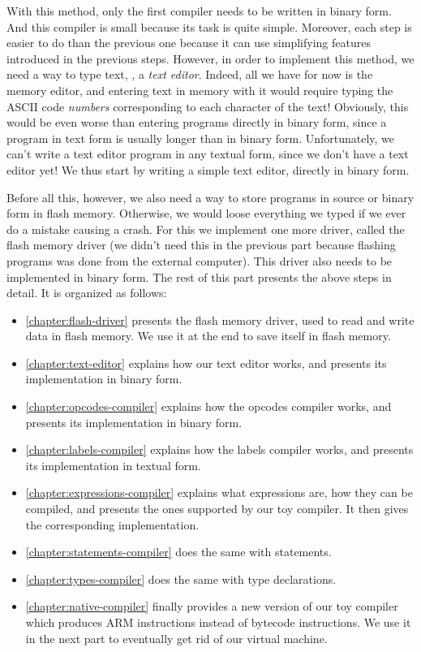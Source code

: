 With this method, only the first compiler needs to be written in binary form.
And this compiler is small because its task is quite simple. Moreover, each
step is easier to do than the previous one because it can use simplifying
features introduced in the previous steps. However, in order to implement this
method, we need a way to type text, \ie, a {\em text editor}. Indeed, all we
have for now is the memory editor, and entering text in memory with it would
require typing the ASCII code {\em numbers} corresponding to each character of
the text! Obviously, this would be even worse than entering programs directly
in binary form, since a program in text form is usually longer than in binary
form. Unfortunately, we can't write a text editor program in any textual form,
since we don't have a text editor yet! We thus start by writing a simple text
editor, directly in binary form.

Before all this, however, we also need a way to store programs in source or
binary form in flash memory. Otherwise, we would loose everything we typed if
we ever do a mistake causing a crash. For this we implement one more driver,
called the flash memory driver (we didn't need this in the previous part
because flashing programs was done from the external computer). This driver
also needs to be implemented in binary form. The rest of this part presents the
above steps in detail. It is organized as follows:

\begin{itemize}
\item \cref{chapter:flash-driver} presents the flash memory driver, used to
read and write data in flash memory. We use it at the end to save itself in
flash memory.

\item \cref{chapter:text-editor} explains how our text editor works, and
presents its implementation in binary form.

\item \cref{chapter:opcodes-compiler} explains how the opcodes compiler works,
and presents its implementation in binary form.

\item \cref{chapter:labels-compiler} explains how the labels compiler works, and
presents its implementation in textual form.

\item \cref{chapter:expressions-compiler} explains what expressions are, how
they can be compiled, and presents the ones supported by our toy compiler. It
then gives the corresponding implementation.

\item \cref{chapter:statements-compiler} does the same with statements.

\item \cref{chapter:types-compiler} does the same with type declarations.

\item \cref{chapter:native-compiler} finally provides a new version of our toy
compiler which produces ARM instructions instead of bytecode instructions. We
use it in the next part to eventually get rid of our virtual machine.
\end{itemize}
